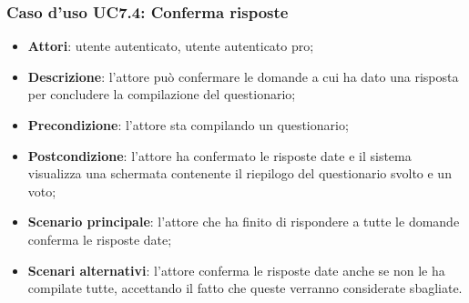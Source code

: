 \subsubsection{Caso d'uso UC7.4: Conferma risposte}
\label{UC7.4}
\begin{itemize}
\item\textbf{Attori}: utente autenticato, utente autenticato pro;
\item\textbf{Descrizione}: l'attore può confermare le domande a cui ha dato una risposta per concludere la compilazione del questionario;
\item\textbf{Precondizione}: l'attore sta compilando un questionario;
\item\textbf{Postcondizione}: l'attore ha confermato le risposte date e il sistema visualizza una schermata contenente il riepilogo del questionario svolto e un voto;
\item\textbf{Scenario principale}: l'attore che ha finito di rispondere a tutte le domande conferma le risposte date;
\item\textbf{Scenari alternativi}: l'attore conferma le risposte date anche se non le ha compilate tutte, accettando il fatto che queste verranno considerate sbagliate.
\end{itemize}